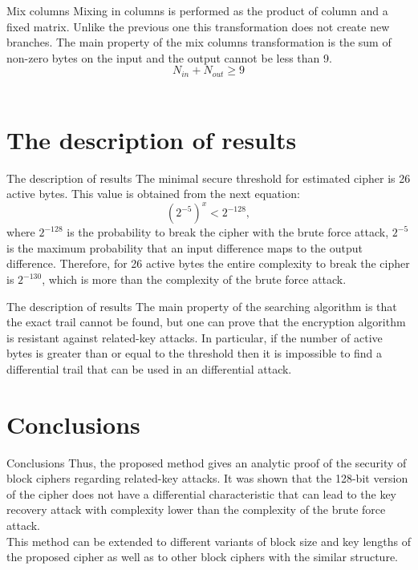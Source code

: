 \documentclass[10pt]{beamer}
\begin{document}
\begin{frame}{Mix columns}
Mixing in columns is performed as the product of column and a fixed matrix. Unlike the previous one this transformation does not create new branches. The main property of the mix columns transformation is the sum of non-zero bytes on the input and the output cannot be less than 9.
$$N_{in} + N_{out} \ge 9$$
\\
\end{frame}

\section{The description of results}

\begin{frame}{The description of results}
The minimal secure threshold for estimated cipher is 26 active bytes. This value is obtained from the next equation:
$$(2^{-5})^x < 2^{-128},$$
where $2^{-128}$ is the probability to break the cipher with the brute force attack, $2^{-5}$ is the maximum probability that an input difference maps to the output difference. Therefore, for 26 active bytes the entire complexity to break the cipher is $2^{-130}$, which is more than the complexity of the brute force attack.
\end{frame}

\begin{frame}{The description of results}
The main property of the searching algorithm is that the exact trail cannot be found, but one can prove that the encryption algorithm is resistant against related-key attacks. \pause In particular, if the number of active bytes is greater than or equal to the threshold then it is impossible to find a differential trail that can be used in an differential attack.
\end{frame}

\section{Conclusions}

\begin{frame}{Conclusions}
Thus, the proposed method gives an analytic proof of the security of block ciphers regarding related-key attacks. It was shown that the 128-bit version of the cipher does not have a differential characteristic that can lead to the key recovery attack with complexity lower than the complexity of the brute force attack. \pause \\
This method can be extended to different variants of block size and key lengths of the proposed cipher as well as to other block ciphers with the similar structure. \\
\end{frame}
\end{document}
